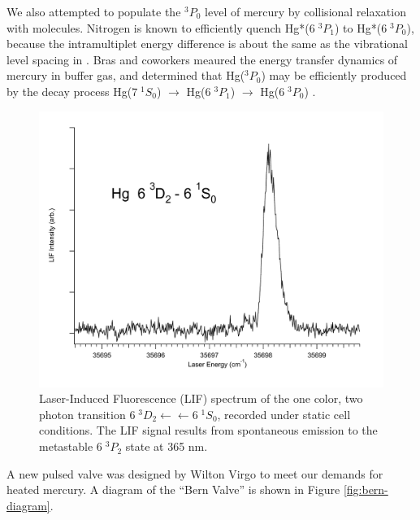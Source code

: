 \documentclass[12pt]{mitthesis}
\begin{document}
We also attempted to populate the $^3P_0$ level of mercury by
collisional relaxation with  molecules.  Nitrogen is known to
efficiently quench Hg*($6 \; ^3P_1$) to Hg*($6 \; ^3P_0$), because the
intramultiplet energy difference is about the same as the vibrational
level spacing in  \cite{callear70, horiguchi71}.  Bras and
coworkers meaured the energy transfer dynamics of mercury in 
buffer gas, and determined that Hg($^3P_0$) may be efficiently
produced by the decay process Hg($7 \; ^1S_0$) $\rightarrow$ Hg($6 \;
^3P_1$) $\rightarrow$ Hg($6 \; ^3P_0$) \cite{bras93}.



\begin{figure}
  \caption{Laser-Induced Fluorescence (LIF) spectrum of the one color,
    two photon transition  $6\;^3D_2 \leftarrow \leftarrow
    6\;^1S_0$, recorded under static cell conditions.  The LIF signal
    results from spontaneous emission to the metastable $6\;^3P_2$
    state at 365 nm.}
  \label{fig:hg3d2-cell}
  \centering
  \includegraphics[width=6in]{Hg3D2-cell.pdf}
\end{figure}

A new pulsed valve was designed by Wilton Virgo to meet our demands
for heated mercury.  A diagram of the ``Bern Valve'' is shown in
Figure \ref{fig:bern-diagram}.
\end{document}
